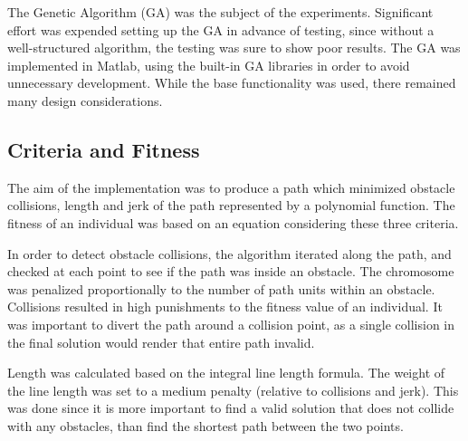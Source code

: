 %
The Genetic Algorithm (GA) was the subject of the experiments. Significant effort was expended setting up the GA in advance of testing, since without a well-structured algorithm, the testing was sure to show poor results. The GA was implemented in Matlab, using the built-in GA libraries in order to avoid unnecessary development. While the base functionality was used, there remained many design considerations.

\subsection{Criteria and Fitness}
The aim of the implementation was to produce a path which minimized obstacle collisions, length and jerk of the path represented by a polynomial function. The fitness of an individual was based on an equation considering these three criteria.

In order to detect obstacle collisions, the algorithm iterated along the path, and checked at each point to see if the path was inside an obstacle. The chromosome was penalized proportionally to the number of path units within an obstacle. Collisions resulted in high punishments to the fitness value of an individual. It was important to divert the path around a collision point, as a single collision in the final solution would render that entire path invalid.

Length was calculated based on the integral line length formula. The weight of the line length was set to a medium penalty (relative to collisions and jerk). This was done since it is more important to find a valid solution that does not collide with any obstacles, than find the shortest path between the two points.


